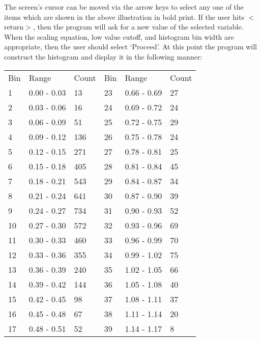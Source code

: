       The screen's cursor can be moved via the arrow keys to select any
   one of the items which are shown in the above illustration in bold
   print.  If the user hits $<$return$>$, then the program will ask for a new
   value of the selected variable.  When the scaling equation, low value
   cutoff, and histogram bin width are appropriate, then the user should
   select `Proceed'.  At this point the program will construct the
   histogram and display it in the following manner:
\begin{center}
\begin{tabular}{||l l l|l l l||}
\hline

             Bin &   Range  &   Count &   Bin &   Range &    Count \\
              1 &  0.00 - 0.03  &   13 &  23 &  0.66 - 0.69  &   27  \\
              2 &  0.03 - 0.06  &   16 &  24 &  0.69 - 0.72  &   24  \\
              3 &  0.06 - 0.09  &   51 &  25 &  0.72 - 0.75  &   29  \\
              4 &  0.09 - 0.12  &  136 &  26 &  0.75 - 0.78  &   24  \\
              5 &  0.12 - 0.15  &  271 &  27 &  0.78 - 0.81  &   25  \\
              6 &  0.15 - 0.18  &  405 &  28 &  0.81 - 0.84  &   45  \\
              7 &  0.18 - 0.21  &  543 &  29 &  0.84 - 0.87  &   34  \\
              8 &  0.21 - 0.24  &  641 &  30 &  0.87 - 0.90  &   39  \\
              9 &  0.24 - 0.27  &  734 &  31 &  0.90 - 0.93  &   52  \\
             10 &  0.27 - 0.30  &  572 &  32 &  0.93 - 0.96  &   69 \\
             11 &  0.30 - 0.33  &  460 &  33 &  0.96 - 0.99  &   70 \\
             12 &  0.33 - 0.36  &  355 &  34 &  0.99 - 1.02  &   75 \\
             13 &  0.36 - 0.39  &  240 &  35 &  1.02 - 1.05  &   66 \\
             14 &  0.39 - 0.42  &  144 &  36 &  1.05 - 1.08  &   40 \\
             15 &  0.42 - 0.45  &   98 &  37 &  1.08 - 1.11  &   37 \\
             16 &  0.45 - 0.48  &   67 &  38 &  1.11 - 1.14  &   20 \\
             17 &  0.48 - 0.51  &   52 &  39 &  1.14 - 1.17  &    8 \\

\end{tabular}
\end{center}
